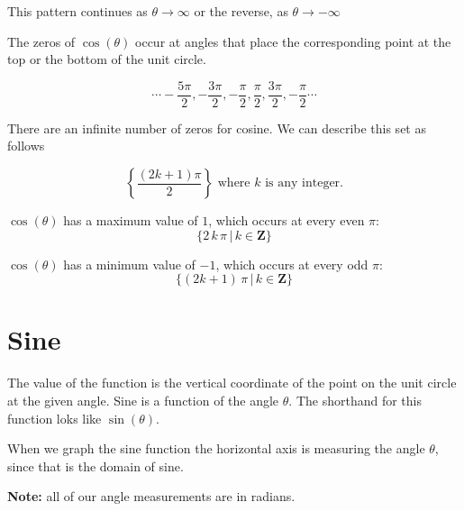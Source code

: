 \documentclass{ximera}
\begin{document}
This pattern continues as $\theta \rightarrow \infty$ or the reverse, as $\theta \rightarrow -\infty$

The zeros of $\cos(\theta)$ occur at angles that place the corresponding point at the top or the bottom of the unit circle.  


\[     \cdots -\frac{5\pi}{2},  -\frac{3\pi}{2},  -\frac{\pi}{2},  \frac{\pi}{2},  \frac{3\pi}{2},  -\frac{\pi}{2} \cdots \]


There are an infinite number of zeros for cosine.  We can describe this set as follows


\[  \left\{     \frac{(2k+1)\pi}{2}          \right\}    \text{ where }  k  \text{ is any integer.}     \]





$\cos(\theta)$ has a maximum value of $1$, which occurs at every even $\pi$:  
\[ \{  2 \, k \, \pi \, | \, k \in \textbf{Z}\} \]



$\cos(\theta)$ has a minimum value of $-1$, which occurs at every odd $\pi$:  
\[ \{  (2k+1) \, \pi \, | \, k \in \textbf{Z}\} \]











\section{Sine}

The value of the function is the vertical coordinate of the point on the unit circle at the given angle. Sine is a function of the angle $\theta$. The shorthand for this function loks like $\sin(\theta)$. 



When we graph the sine function the horizontal axis is measuring the angle $\theta$, since that is the domain of sine.

\textbf{Note:}  all of our angle measurements are in radians.
\end{document}
